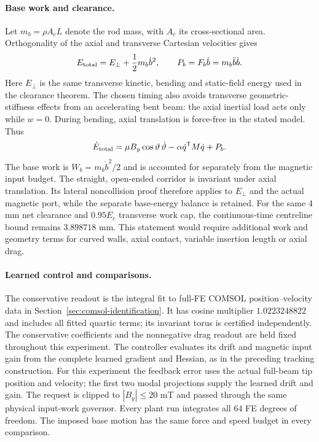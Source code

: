 \paragraph{Base work and clearance.}
Let $m_b=\rho A_cL$ denote the rod mass, with $A_c$ its cross-sectional area.
Orthogonality of the axial and transverse Cartesian velocities gives
\begin{equation}
 E_{\rm total}=E_\perp+\frac12m_b\dot b^2,
 \qquad P_b=F_b\dot b=m_b\ddot b\dot b.
 \label{eq:s-path-base-energy}
\end{equation}
Here $E_\perp$ is the same transverse kinetic, bending and static-field
energy used in the clearance theorem. The chosen timing also avoids
transverse geometric-stiffness effects from an accelerating bent beam:
the axial inertial load acts only while $w=0$. During bending, axial
translation is force-free in the stated model. Thus
\begin{equation}
 \dot E_{\rm total}
 =\mu B_y\cos\vartheta\,\dot\vartheta
  -\alpha\dot q^{\mathsf T}M\dot q+P_b.
 \label{eq:s-path-total-power}
\end{equation}
The base work is $W_b=m_b\dot b^2/2$ and is accounted for separately
from the magnetic input budget.
The straight, open-ended corridor is invariant under axial translation.
Its lateral noncollision proof therefore applies to $E_\perp$ and the
actual magnetic port, while the separate base-energy balance is retained.
For the same $4$ mm net clearance and $0.95E_c$ transverse work cap,
the continuous-time centreline bound remains $3.898718$ mm.
This statement would require additional work and geometry terms for
curved walls, axial contact, variable insertion length or axial drag.

\paragraph{Learned control and comparisons.}
The conservative readout is the integral fit to full-FE COMSOL
position--velocity data in Section~\ref{sec:comsol-identification}.
It has cosine multiplier $1.0223248822$ and includes all fitted quartic
terms; its invariant torus is certified independently. The conservative
coefficients and the nonnegative drag readout are held fixed throughout
this experiment. The controller evaluates its drift and
magnetic input gain from the complete learned gradient and Hessian,
as in the preceding tracking construction. For this experiment the
feedback error uses the actual full-beam tip position and velocity;
the first two modal projections supply the learned drift and gain.
The request is clipped to $|B_y|\leq20$ mT and passed through the
same physical input-work governor. Every plant run integrates all
$64$ FE degrees of freedom. The imposed base motion has the same
force and speed budget in every comparison.

